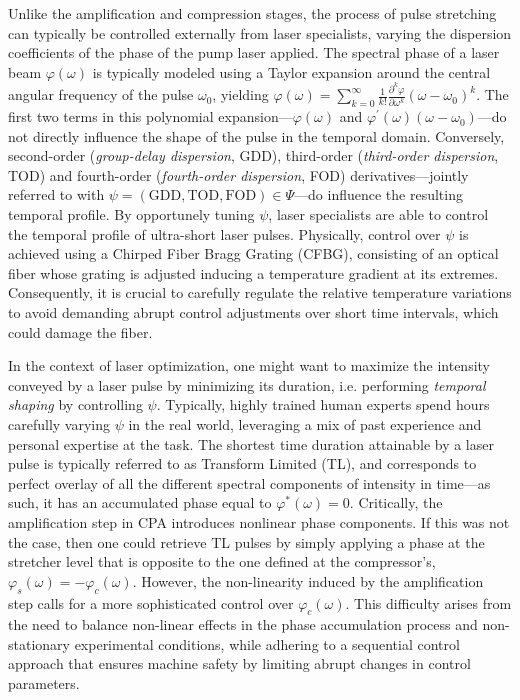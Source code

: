 Unlike the amplification and compression stages, the process of pulse stretching can typically be controlled externally from laser specialists, varying the dispersion coefficients of the phase of the pump laser applied. The spectral phase of a laser beam $\varphi(\omega)$ is typically modeled using a Taylor expansion around the central angular frequency of the pulse $\omega_0$, yielding $\varphi(\omega) = \sum_{k=0}^{\infty} \frac 1{k!}\frac{\partial^k \varphi}{\partial \omega^k} (\omega - \omega_0)^k$. The first two terms in this polynomial expansion---$\varphi(\omega)$ and $\varphi^\prime(\omega)(\omega - \omega_0)$---do not directly influence the shape of the pulse in the temporal domain. Conversely, second-order (\textit{group-delay dispersion}, GDD), third-order (\textit{third-order dispersion}, TOD) and fourth-order (\textit{fourth-order dispersion}, FOD) derivatives---jointly referred to with $\psi = (\text{GDD}, \text{TOD}, \text{FOD}) \in \Psi$---do influence the resulting temporal profile. By opportunely tuning $\psi$, laser specialists are able to control the temporal profile of ultra-short laser pulses. Physically, control over $\psi$ is achieved using a Chirped Fiber Bragg Grating (CFBG), consisting of an optical fiber whose grating is adjusted inducing a temperature gradient at its extremes. Consequently, it is crucial to carefully regulate the relative temperature variations to avoid demanding abrupt control adjustments over short time intervals, which could damage the fiber.

In the context of laser optimization, one might want to maximize the intensity conveyed by a laser pulse by minimizing its duration, i.e. performing \textit{temporal shaping} by controlling $\psi$. Typically, highly trained human experts spend hours carefully varying $\psi$ in the real world, leveraging a mix of past experience and personal expertise at the task. The shortest time duration attainable by a laser pulse is typically referred to as Transform Limited (TL), and corresponds to perfect overlay of all the different spectral components of intensity in time---as such, it has an accumulated phase equal to $\varphi^*(\omega)=0$. Critically, the amplification step in CPA introduces nonlinear phase components. If this was not the case, then one could retrieve TL pulses by simply applying a phase at the stretcher level that is opposite to the one defined at the compressor's, $\varphi_s(\omega) = - \varphi_c(\omega)$. However, the non-linearity induced by the amplification step calls for a more sophisticated control over $\varphi_c(\omega)$. This difficulty arises from the need to balance non-linear effects in the phase accumulation process and non-stationary experimental conditions, while adhering to a sequential control approach that ensures machine safety by limiting abrupt changes in control parameters. 

